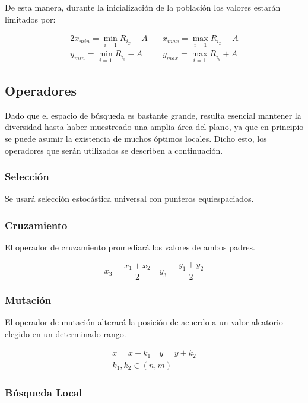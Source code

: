 \documentclass[journal]{IEEEtran}
\begin{document}
De esta manera, durante la inicialización de la población los valores estarán limitados por:

\begin{alignat*}{2}
x_{min} = \min_{i=1} {R_{i_x} - A} &\quad x_{max} = \max_{i=1} {R_{i_x} + A} \\
y_{min} = \min_{i=1} {R_{i_y} - A} &\quad y_{max} = \max_{i=1} {R_{i_y} + A}
\end{alignat*}

\subsection{Operadores}

Dado que el espacio de búsqueda es bastante grande, resulta esencial mantener la diversidad hasta haber muestreado una amplia área del plano, ya que en principio se puede asumir la existencia de muchos óptimos locales. Dicho esto, los operadores que serán utilizados se describen a continuación.\\

\subsubsection{Selección}

Se usará selección estocástica universal con punteros equiespaciados.\\


\subsubsection{Cruzamiento}

El operador de cruzamiento promediará los valores de ambos padres.

$$x_3 = \frac {x_1 + x_2} {2} \quad y_3 = \frac {y_1 + y_2} {2}$$

\subsubsection{Mutación}

El operador de mutación alterará la posición de acuerdo a un valor aleatorio elegido en un determinado rango.

\begin{gather*}
x = x + k_1 \quad y = y + k_2\\
k_1, k_2 \in (n,m)
\end{gather*}

\subsubsection{Búsqueda Local}
\end{document}

